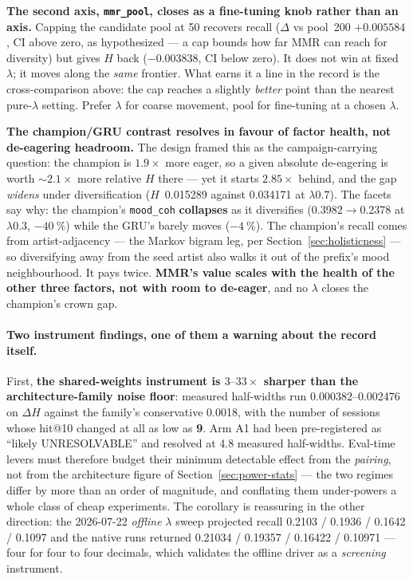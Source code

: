 \documentclass[11pt]{article}
\begin{document}
\textbf{The second axis, \texttt{mmr\_pool}, closes as a fine-tuning knob rather
than an axis.} Capping the candidate pool at \num{50} recovers recall
($\Delta$ vs pool~\num{200} $+\num{0.005584}$, CI above zero, as hypothesized ---
a cap bounds how far MMR can reach for diversity) but gives $H$ back
($-\num{0.003838}$, CI below zero). It does not win at fixed $\lambda$; it moves
along the \emph{same} frontier. What earns it a line in the record is the
cross-comparison above: the cap reaches a slightly \emph{better} point than the
nearest pure-$\lambda$ setting. Prefer $\lambda$ for coarse movement, pool for
fine-tuning at a chosen $\lambda$.

\textbf{The champion/GRU contrast resolves in favour of factor health, not
de-eagering headroom.} The design framed this as the campaign-carrying question:
the champion is $\num{1.9}\times$ more eager, so a given absolute de-eagering is
worth ${\sim}\num{2.1}\times$ more relative $H$ there --- yet it starts
$\num{2.85}\times$ behind, and the gap \emph{widens} under diversification
($H$~\num{0.015289} against \num{0.034171} at $\lambda\num{0.7}$). The facets say
why: the champion's \texttt{mood\_coh} \textbf{collapses} as it diversifies
(\num{0.3982}$\to$\num{0.2378} at $\lambda\num{0.3}$, $-\SI{40}{\percent}$) while
the GRU's barely moves ($-\SI{4}{\percent}$). The champion's recall comes from
artist-adjacency --- the Markov bigram leg, per
Section~\ref{sec:holisticness} --- so diversifying away from the seed artist also
walks it out of the prefix's mood neighbourhood. It pays twice. \textbf{MMR's
value scales with the health of the other three factors, not with room to
de-eager}, and no $\lambda$ closes the champion's crown gap.

\paragraph{Two instrument findings, one of them a warning about the record
itself.} First, \textbf{the shared-weights instrument is
$\numrange{3}{33}\times$ sharper than the architecture-family noise floor}:
measured half-widths run \numrange{0.000382}{0.002476} on $\Delta H$ against the
family's conservative \num{0.0018}, with the number of sessions whose hit@10
changed at all as low as \textbf{\num{9}}. Arm A1 had been pre-registered as
``likely UNRESOLVABLE'' and resolved at \num{4.8} measured half-widths.
Eval-time levers must therefore budget their minimum detectable effect from the
\emph{pairing}, not from the architecture figure of
Section~\ref{sec:power-stats} --- the two regimes differ by more than an order of
magnitude, and conflating them under-powers a whole class of cheap experiments.
The corollary is reassuring in the other direction: the 2026-07-22 \emph{offline}
$\lambda$ sweep projected recall \num{0.2103} / \num{0.1936} / \num{0.1642} /
\num{0.1097} and the native runs returned \num{0.21034} / \num{0.19357} /
\num{0.16422} / \num{0.10971} --- four for four to four decimals, which validates
the offline driver as a \emph{screening} instrument.
\end{document}
